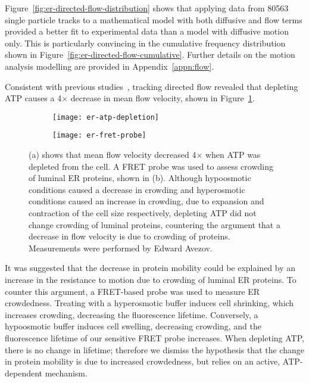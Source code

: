 Figure~\ref{fig:er-directed-flow-distribution} shows that applying data from \num{80563} single particle tracks to a mathematical model with both diffusive and flow terms provided a better fit to experimental data than a model with diffusive motion only.
This is particularly convincing in the cumulative frequency distribution shown in Figure~\ref{fig:er-directed-flow-cumulative}.
Further details on the motion analysis modelling are provided in Appendix~\ref{appn:flow}. 

Consistent with previous studies~\cite{nehls2000dynamics}, tracking directed flow revealed that depleting ATP causes a 4$\times$ decrease in mean flow velocity, shown in Figure~\ref{fig:er-atp-depletion}.

\begin{figure}[t!]
	\centering
	\begin{subfigure}[b]{0.3\textwidth}
		\texttt{[image: er-atp-depletion]}
		\caption{} \label{fig:er-atp-depletion}
	\end{subfigure}
	\hspace{0.15\textwidth}
	\begin{subfigure}[b]{0.3\textwidth}
		\texttt{[image: er-fret-probe]}
		\caption{} \label{fig:er-fret-probe}
	\end{subfigure}
	\caption[ER: Flow velocity is reduced upon ATP depletion; a FRET probe reveals this is not due to increased crowding]{(a) shows that mean flow velocity decreased 4$\times$ when ATP was depleted from the cell. A FRET probe was used to assess crowding of luminal ER proteins, shown in (b). Although hypoosmotic conditions caused a decrease in crowding and hyperosmotic conditions caused an increase in crowding, due to expansion and contraction of the cell size respectively, depleting ATP did not change crowding of luminal proteins, countering the argument that a decrease in flow velocity is due to crowding of proteins. Measurements were performed by Edward Avezov. }
	\label{fig:er-atp}
\end{figure}

It was suggested that the decrease in protein mobility could be explained by an increase in the resistance to motion due to crowding of luminal ER proteins.
To counter this argument, a FRET-based probe was used to measure ER crowdedness.
Treating with a hyperosmotic buffer induces cell shrinking, which increases crowding, decreasing the fluorescence lifetime.
Conversely, a hypoosmotic buffer induces cell swelling, decreasing crowding, and the fluorescence lifetime of our sensitive FRET probe increases.
When depleting ATP, there is no change in lifetime;
therefore we dismiss the hypothesis that the change in protein mobility is due to increased crowdedness, but relies on an active, ATP-dependent mechanism.

